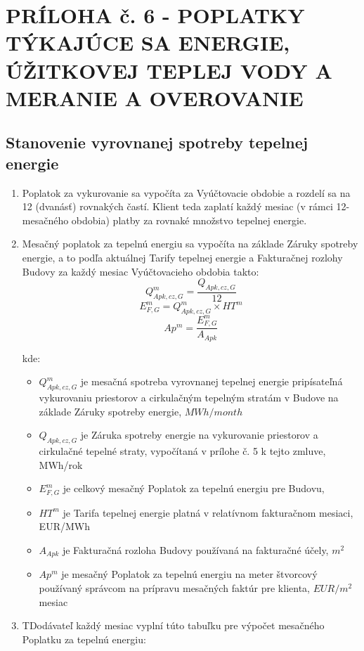 \section{PRÍLOHA č. 6 {-} POPLATKY TÝKAJÚCE SA ENERGIE, ÚŽITKOVEJ TEPLEJ VODY A MERANIE A OVEROVANIE}

\subsection{Stanovenie vyrovnanej spotreby tepelnej energie }
\begin{enumerate}
	\item 	Poplatok za vykurovanie sa vypočíta za Vyúčtovacie obdobie a rozdelí sa na 12 (dvanásť) rovnakých častí. Klient teda zaplatí každý mesiac (v rámci 12-mesačného obdobia) platby za rovnaké množstvo tepelnej energie. 
	\item	Mesačný poplatok za tepelnú energiu sa vypočíta na základe Záruky spotreby energie, a to podľa aktuálnej Tarify tepelnej energie a Fakturačnej rozlohy Budovy za každý mesiac Vyúčtovacieho obdobia takto:
\[ Q^{m}_{Apk,cz,G} = \frac{Q_{Apk,cz,G}}{12} \]
\[ E^{m}_{F,G} = Q^{m}_{Apk,cz,G} \times HT^m \]
\[ Ap^m = \frac{E^{m}_{F,G}}{A_{Apk}} \]

kde:

\begin{itemize}
	\item $Q^{m}_{Apk,cz,G}$ je mesačná spotreba vyrovnanej tepelnej energie pripísateľná vykurovaniu priestorov a cirkulačným tepelným stratám v Budove na základe Záruky spotreby energie, $MWh/month$
	\item $Q_{Apk,cz,G}$ je Záruka spotreby energie na vykurovanie priestorov a cirkulačné tepelné straty, vypočítaná v prílohe č. 5 k tejto zmluve, MWh/rok
	\item $E^{m}_{F,G}$ je celkový mesačný Poplatok za tepelnú energiu pre Budovu,
	\item $HT^m$ je Tarifa tepelnej energie platná v relatívnom fakturačnom mesiaci, EUR/MWh
	\item $A_{Apk}$ je Fakturačná rozloha Budovy používaná na fakturačné účely, $m^2$
	\item $Ap^m$ je mesačný Poplatok za tepelnú energiu na meter štvorcový používaný správcom na prípravu mesačných faktúr pre klienta,  $EUR/m^2$ mesiac 
\end{itemize}

	\item TDodávateľ každý mesiac vyplní túto tabuľku pre výpočet mesačného Poplatku za tepelnú energiu:


\end{enumerate}
